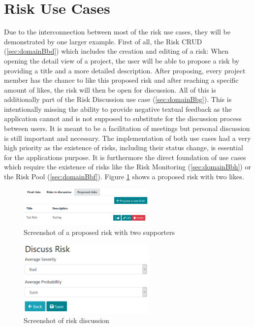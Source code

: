 
\section{Risk Use Cases}
\label{sec:implementationRisks}

Due to the interconnection between most of the risk use cases, they will be demonstrated by one larger example. First of all, the Risk CRUD (\ref{sec:domainBbd}) which includes the creation and editing of a risk: When opening the detail view of a project, the user will be able to propose a risk by providing a title and a more detailed description. After proposing, every project member has the chance to like this proposed risk and after reaching a specific amount of likes, the risk will then be open for discussion. All of this is additionally part of the Risk Discussion use case (\ref{sec:domainBbg}). This is intentionally missing the ability to provide negative textual feedback as the application cannot and is not supposed to substitute for the discussion process between users. It is meant to be a facilitation of meetings but personal discussion is still important and necessary. The implementation of both use cases had a very high priority as the existence of risks, including their status change, is essential for the applications purpose. It is furthermore the direct foundation of use cases which require the existence of risks like the Risk Monitoring (\ref{sec:domainBbh}) or the Risk Pool (\ref{sec:domainBbf}). Figure \ref{fig:proposedrisk} shows a proposed risk with two likes.

\begin{figure}[H]
	\centering
	\includegraphics[width=0.6\textwidth]{Assets/implementation_shots/proposed_risk.png}
	\caption{Screenshot of a proposed risk with two supporters}
	\label{fig:proposedrisk}
\end{figure}

\begin{figure}[H]
	\centering
	\includegraphics[width=0.6\textwidth]{Assets/implementation_shots/riskdiscussion.png}
	\caption{Screenshot of risk discussion}
	\label{fig:riskdiscussion}
\end{figure}

